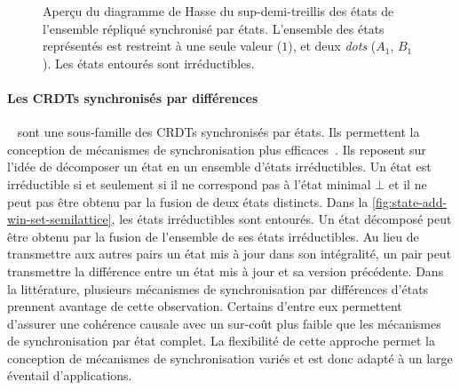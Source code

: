 \begin{figure}[tb]
\centering
{}
\caption[Sup-demi-treillis des états de l'ensemble répliqué synchronisé par états]{Aperçu du diagramme de Hasse du sup-demi-treillis des états de l'ensemble répliqué synchronisé par états.
L'ensemble des états représentés est restreint à une seule valeur ($1$), et deux \emph{dots} ($A_1$, $B_1$).
Les états entourés sont irréductibles.
}\label{fig:state-add-win-set-semilattice}
\end{figure}


\paragraph{Les \acp{CRDT} synchronisés par différences}~\autocite{almeida_2018_delta-crdt-revisited} sont une sous-famille des \acp{CRDT} synchronisés par états.
Ils permettent la conception de mécanismes de synchronisation plus efficaces~\autocite{enes_2018_efficient-sync-state-based-crdt}.
Ils reposent sur l'idée de décomposer un état en un ensemble d'états irréductibles.
Un état est irréductible si et seulement si il ne correspond pas à l'état minimal $\bot$ et il ne peut pas être obtenu par la fusion de deux états distincts.
Dans la \autoref{fig:state-add-win-set-semilattice}, les états irréductibles sont entourés.
Un état décomposé peut être obtenu par la fusion de l'ensemble de ses états irréductibles.
Au lieu de transmettre aux autres pairs un état mis à jour dans son intégralité, un pair peut transmettre la différence entre un état mis à jour et sa version précédente.
Dans la littérature, plusieurs mécanismes de synchronisation par différences d'états prennent avantage de cette observation.
Certains d'entre eux permettent d'assurer une cohérence causale avec un sur-coût plus faible que les mécanismes de synchronisation par état complet.
La flexibilité de cette approche permet la conception de mécanismes de synchronisation variés et est donc adapté à un large éventail d'applications.

